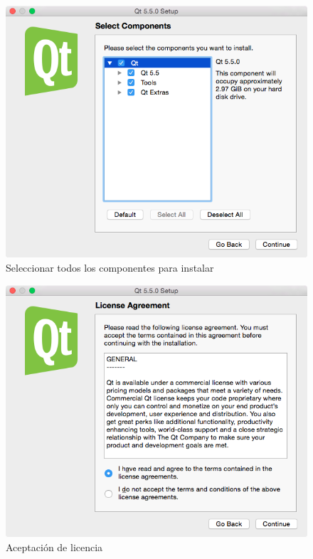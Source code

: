 \begin{figure}[htbp]
\centering
\includegraphics[width=11.5cm]{qt-3}
\caption{Seleccionar todos los componentes para instalar}
\label{fig:qt-3}
\end{figure}

\begin{figure}[htbp]
\centering
\includegraphics[width=11.5cm]{qt-4}
\caption{Aceptación de licencia}
\label{fig:qt-4}
\end{figure}

